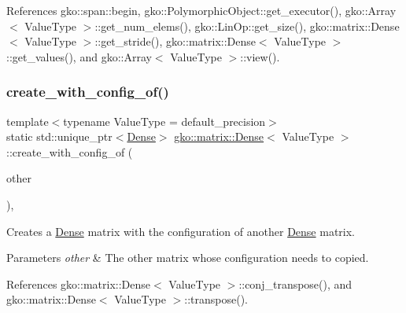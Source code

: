References gko\+::span\+::begin, gko\+::\+Polymorphic\+Object\+::get\+\_\+executor(), gko\+::\+Array$<$ Value\+Type $>$\+::get\+\_\+num\+\_\+elems(), gko\+::\+Lin\+Op\+::get\+\_\+size(), gko\+::matrix\+::\+Dense$<$ Value\+Type $>$\+::get\+\_\+stride(), gko\+::matrix\+::\+Dense$<$ Value\+Type $>$\+::get\+\_\+values(), and gko\+::\+Array$<$ Value\+Type $>$\+::view().

\mbox{\label{classgko_1_1matrix_1_1Dense_a4c2089b9e1f7a99a32488a4964e832db}} 
\subsubsection{\texorpdfstring{create\+\_\+with\+\_\+config\+\_\+of()}{create\_with\_config\_of()}}
{\footnotesize\ttfamily template$<$typename Value\+Type = default\+\_\+precision$>$ \\
static std\+::unique\+\_\+ptr$<$\hyperlink{classgko_1_1matrix_1_1Dense}{Dense}$>$ \hyperlink{classgko_1_1matrix_1_1Dense}{gko\+::matrix\+::\+Dense}$<$ Value\+Type $>$\+::create\+\_\+with\+\_\+config\+\_\+of (\begin{DoxyParamCaption}\item[{const \hyperlink{classgko_1_1matrix_1_1Dense}{Dense}$<$ Value\+Type $>$ $\ast$}]{other }\end{DoxyParamCaption})\hspace{0.3cm}{\ttfamily [inline]}, {\ttfamily [static]}}



Creates a \hyperlink{classgko_1_1matrix_1_1Dense}{Dense} matrix with the configuration of another \hyperlink{classgko_1_1matrix_1_1Dense}{Dense} matrix. 


\begin{DoxyParams}{Parameters}
{\em other} & The other matrix whose configuration needs to copied. \\
\hline
\end{DoxyParams}


References gko\+::matrix\+::\+Dense$<$ Value\+Type $>$\+::conj\+\_\+transpose(), and gko\+::matrix\+::\+Dense$<$ Value\+Type $>$\+::transpose().

\mbox{\label{classgko_1_1matrix_1_1Dense_ab83c739c1b11abaecc3bfd89506f6c9c}} 
